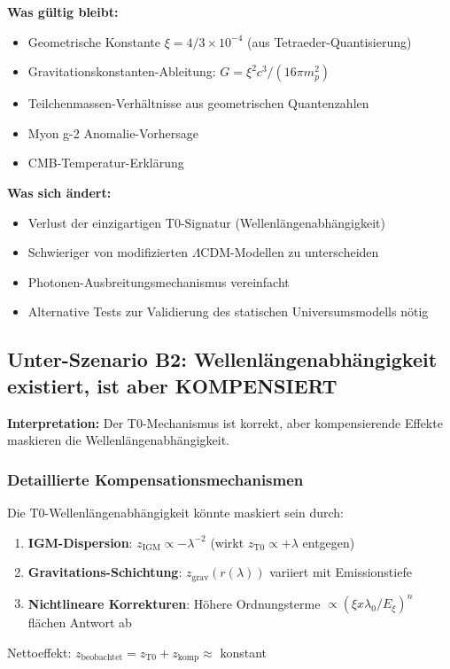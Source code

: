 \documentclass[12pt,a4paper]{article}
\theoremstyle{definition}
\begin{document}
	\textbf{Was g\"ultig bleibt:}
	\begin{itemize}
		\item Geometrische Konstante $\xi = 4/3 \times 10^{-4}$ (aus Tetraeder-Quantisierung)
		\item Gravitationskonstanten-Ableitung: $G = \xi^2 c^3/(16\pi m_p^2)$
		\item Teilchenmassen-Verh\"altnisse aus geometrischen Quantenzahlen
		\item Myon g-2 Anomalie-Vorhersage
		\item CMB-Temperatur-Erkl\"arung
	\end{itemize}
	
	\textbf{Was sich \"andert:}
	\begin{itemize}
		\item Verlust der einzigartigen T0-Signatur (Wellenl\"angenabh\"angigkeit)
		\item Schwieriger von modifizierten $\Lambda$CDM-Modellen zu unterscheiden
		\item Photonen-Ausbreitungsmechanismus vereinfacht
		\item Alternative Tests zur Validierung des statischen Universumsmodells n\"otig
	\end{itemize}
	
	\subsection{Unter-Szenario B2: Wellenl\"angenabh\"angigkeit existiert, ist aber KOMPENSIERT}
	\label{subsec:scenario_b2}
	
	\textbf{Interpretation:} Der T0-Mechanismus ist korrekt, aber kompensierende Effekte maskieren die Wellenl\"angenabh\"angigkeit.
	
	\subsubsection{Detaillierte Kompensationsmechanismen}
	
	\begin{formula}[title=Drei Kompensationsmechanismen]
		Die T0-Wellenl\"angenabh\"angigkeit k\"onnte maskiert sein durch:
		\begin{enumerate}
			\item \textbf{IGM-Dispersion}: $z_{\text{IGM}} \propto -\lambda^{-2}$ (wirkt $z_{\text{T0}} \propto +\lambda$ entgegen)
			\item \textbf{Gravitations-Schichtung}: $z_{\text{grav}}(r(\lambda))$ variiert mit Emissionstiefe
			\item \textbf{Nichtlineare Korrekturen}: H\"ohere Ordnungsterme $\propto (\xi x \lambda_0/E_\xi)^n$ fl\"achen Antwort ab
		\end{enumerate}
		Nettoeffekt: $z_{\text{beobachtet}} = z_{\text{T0}} + z_{\text{komp}} \approx$ konstant
	\end{formula}
	
\end{document}
